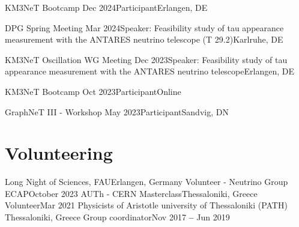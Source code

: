 \documentclass[letterpaper,11pt]{article}
\begin{document}
      \resumeSubheading
      {KM3NeT Bootcamp}
      {Dec 2024}{Participant}{Erlangen, DE}
      
      \resumeSubheading
      {DPG Spring Meeting}
      {Mar 2024}{Speaker: Feasibility study of tau appearance measurement with the ANTARES neutrino telescope (T 29.2)}{Karlruhe, DE}

      \resumeSubheading
      {KM3NeT Oscillation WG Meeting}
      {Dec 2023}{Speaker: Feasibility study of tau appearance measurement with the ANTARES neutrino telescope}{Erlangen, DE}

      \resumeSubheading
      {KM3NeT Bootcamp}
      {Oct 2023}{Participant}{Online}
      
      \resumeSubheading
      {GraphNeT III - Workshop}
      {May 2023}{Participant}{Sandvig, DN}
\resumeSubHeadingListEnd




    
    

\section{Volunteering}
    \resumeSubHeadingListStart
    \resumeSubheading
      {Long Night of Sciences, FAU}{Erlangen, Germany}
      {Volunteer - Neutrino Group ECAP}{October 2023}
        \resumeItemListStart
        \resumeItemListEnd
        \resumeSubheading
      {AUTh - CERN Masterclass}{Thessaloniki, Greece}
      {Volunteer}{Mar 2021}
        \resumeItemListStart
        \resumeItemListEnd
    \resumeSubheading
      {Physicists of Aristotle university of Thessaloniki (PATH) }{Thessaloniki, Greece}
      {Group coordinator}{Nov 2017 \textbf{--} Jun 2019}
        \resumeItemListStart
    \resumeItemListEnd    
    \resumeSubHeadingListEnd
\end{document}
